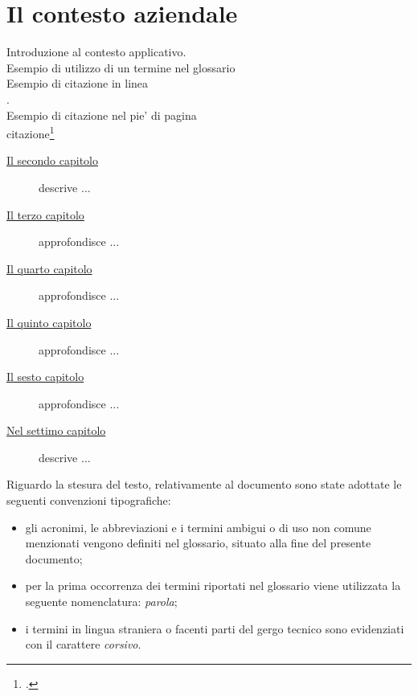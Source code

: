 
\chapter{Il contesto aziendale}
\label{cap:contesto-aziendale}

Introduzione al contesto applicativo.\\

\noindent Esempio di utilizzo di un termine nel glossario \\

\noindent Esempio di citazione in linea \\
\cite{site:agile-manifesto}. \\

\noindent Esempio di citazione nel pie' di pagina \\
citazione\footcite{womak:lean-thinking} \\


\begin{description}
    \item[{\hyperref[cap:introduzione]{Il secondo capitolo}}] descrive ...
    
    \item[{\hyperref[cap:descrizione-stage]{Il terzo capitolo}}] approfondisce ...
    
    \item[{\hyperref[cap:analisi-requisiti]{Il quarto capitolo}}] approfondisce ...
    
    \item[{\hyperref[cap:progettazione-codifica]{Il quinto capitolo}}] approfondisce ...
    
    \item[{\hyperref[cap:verifica-validazione]{Il sesto capitolo}}] approfondisce ...
    
    \item[{\hyperref[cap:conclusioni]{Nel settimo capitolo}}] descrive ...
\end{description}

Riguardo la stesura del testo, relativamente al documento sono state adottate le seguenti convenzioni tipografiche:
\begin{itemize}
	\item gli acronimi, le abbreviazioni e i termini ambigui o di uso non comune menzionati vengono definiti nel glossario, situato alla fine del presente documento;
	\item per la prima occorrenza dei termini riportati 
	nel glossario viene utilizzata la seguente nomenclatura: \emph{parola}\glsfirstoccur{};
	\item i termini in lingua straniera o facenti parti del gergo tecnico sono evidenziati con il carattere \emph{corsivo}.
\end{itemize}

